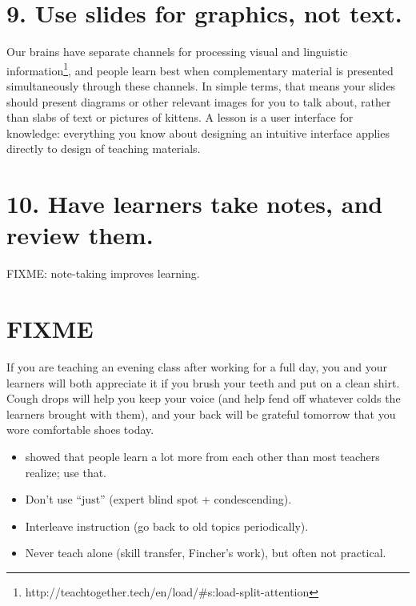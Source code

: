 \documentclass[10pt,letterpaper]{article}
\newcommand{\rulemajor}[1]{\section{#1}}
\begin{document}
\rulemajor{9. Use slides for graphics, not text.}

Our brains have separate channels for
processing visual and linguistic information\footnote{http://teachtogether.tech/en/load/\#s:load-split-attention},
and people learn best when complementary material is presented simultaneously through these channels.
In simple terms,
that means your slides should present diagrams or other relevant images for you to talk about,
rather than slabs of text or pictures of kittens.
A lesson is a user interface for knowledge:
everything you know about designing an intuitive interface applies directly to design of teaching materials.

\rulemajor{10. Have learners take notes, and review them.}

FIXME: note-taking improves learning.

\section*{FIXME}

If you are teaching an evening class after working for a full day,
you and your learners will both appreciate it if you brush your teeth and put on a clean shirt.
Cough drops will help you keep your voice (and help fend off whatever colds the learners brought with them),
and your back will be grateful tomorrow that you wore comfortable shoes today.

\begin{itemize}

\item \cite{Nuth2007} showed that people learn a lot more from each other
  than most teachers realize; use that.

\item Don't use ``just'' (expert blind spot + condescending).

\item Interleave instruction (go back to old topics periodically).

\item Never teach alone (skill transfer, Fincher's work), but often not practical.

\end{itemize}

\cite{Ambr2010}
\cite{Hust2012}
\cite{Lang2016}
\cite{Lemo2014}
\cite{Majo2015}
\cite{Maye2003}
\cite{Maye2009}
\cite{Mill1956}
\cite{Nuth2007}
\cite{Rice2018}
\cite{Wein2018a}
\cite{Wein2018b}
\cite{Wlod2017}


\end{document}

